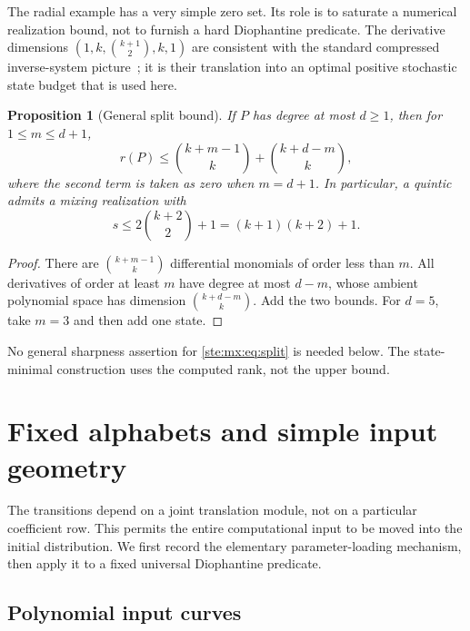 \documentclass[11pt,letterpaper]{article}
\newtheorem{proposition}[theorem]{Proposition}
\theoremstyle{definition}
\theoremstyle{remark}
\begin{document}
The radial example has a very simple zero set. Its role is to saturate a
numerical realization bound, not to furnish a hard Diophantine predicate.
The derivative dimensions $(1,k,\binom{k+1}{2},k,1)$ are consistent with the
standard compressed inverse-system picture~\cite{masuti-rossi}; it is their
translation into an optimal positive stochastic state budget that is used here.

\begin{proposition}[General split bound]\label{ste:mx:prop:split}
If $P$ has degree at most $d\geq1$, then for $1\leq m\leq d+1$,
\begin{equation}\label{ste:mx:eq:split}
 r(P)\leq\binom{k+m-1}{k}+\binom{k+d-m}{k},
\end{equation}
where the second term is taken as zero when $m=d+1$. In particular, a
quintic admits a mixing realization with
\begin{equation}\label{ste:mx:eq:quinticbound}
 s\leq 2\binom{k+2}{2}+1=(k+1)(k+2)+1.
\end{equation}
\end{proposition}
\begin{proof}
There are $\binom{k+m-1}{k}$ differential monomials of order less than $m$.
All derivatives of order at least $m$ have degree at most $d-m$, whose
ambient polynomial space has dimension $\binom{k+d-m}{k}$. Add the two
bounds. For $d=5$, take $m=3$ and then add one state.
\end{proof}

No general sharpness assertion for \eqref{ste:mx:eq:split} is needed below. The
state-minimal construction uses the computed rank, not the upper bound.

\section{Fixed alphabets and simple input geometry}\label{ste:mx:sec:universal}

The transitions depend on a joint translation module, not on a particular
coefficient row. This permits the entire computational input to be moved into
the initial distribution. We first record the elementary parameter-loading
mechanism, then apply it to a fixed universal Diophantine predicate.

\subsection{Polynomial input curves}
\end{document}
